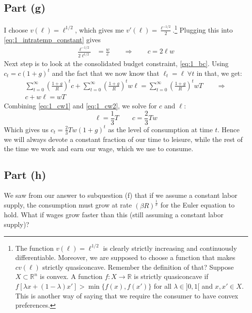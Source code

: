 \documentclass{scrartcl}
\newcommand{\lep}{\left(}
\newcommand{\rip}{\right)}
\begin{document}
\subsection*{Part (g)}
I choose $v(\ell) = \ell^{1/2}$, which gives me $v'(\ell) = \frac{\ell^{-1/2}}{2}$.\footnote{The function $v(\ell) = \ell^{1/2}$ is clearly strictly increasing and continuously differentiable. Moreover, we are supposed to choose a function that makes $cv(\ell)$ strictly quasiconcave. Remember the definition of that? Suppose $X \subset \mathbb{R}^n$ is convex. A function $f: X \rightarrow \mathbb{R}$ is strictly quasiconcave if $f[\lambda x + (1-\lambda)x'] > \min \{f(x), f(x')\}$ for all $\lambda \in ]0,1[$ and $x, x' \in X$. This is another way of saying that we require the consumer to have convex preferences.} Plugging this into \eqref{eq:1_intratemp_constant} gives
\begin{align}
	\frac{\ell^{-1/2}}{2\ell^{1/2}} &= \frac{w}{c} \qquad \Rightarrow \qquad
	c = 2\ell w \label{eq:1_cw1}
\end{align}
Next step is to look at the consolidated budget constraint, \eqref{eq:1_bc}. Using $c_t = c(1+g)^t$ and the fact that we now know that $\ell_t = \ell ~ \forall t$ in that, we get: 
\begin{gather}
	\sum_{t=0}^{\infty} \lep\frac{1+g}{R} \rip^t c + 
	\sum_{t=0}^{\infty} \lep\frac{1+g}{R} \rip^t w \ell = 
	\sum_{t=0}^{\infty} \lep\frac{1+g}{R} \rip^t w T \qquad \Rightarrow \\
	c + w\ell = wT \label{eq:1_cw2}
\end{gather}
Combining \eqref{eq:1_cw1} and \eqref{eq:1_cw2}, we solve for $c$ and $\ell$: 
\begin{equation}
	\ell = \frac{1}{3}T \qquad c = \frac{2}{3}Tw \label{eq:1_c_and_l}
\end{equation}
Which gives us $c_t = \frac{2}{3}Tw(1+g)^t$ as the level of consumption at time $t$. 
Hence we will always devote a constant fraction of our time to leisure, while the rest of the time we work and earn our wage, which we use to consume. 

\subsection*{Part (h)}
We saw from our answer to subquestion (f) that if we assume a constant labor supply, the consumption must grow at rate $(\beta R)^{\frac{1}{\sigma}}$ for the Euler equation to hold. What if wages grow faster than this (still assuming a constant labor supply)? 
\end{document}
